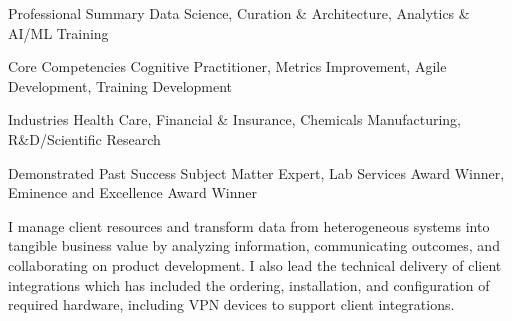 

\begin{cvskills}

  \cvskill
    {Professional Summary} %
    {Data Science, Curation \& Architecture, Analytics \& AI/ML Training} 

  \cvskill
    {Core Competencies} %
    {Cognitive Practitioner, Metrics Improvement, Agile Development, Training Development}

  \cvskill
    {Industries} %
    {Health Care, Financial \& Insurance, Chemicals Manufacturing, R\&D/Scientific Research}

  \cvskill
    {Demonstrated Past Success} %
    {Subject Matter Expert, Lab Services Award Winner, Eminence and Excellence Award Winner}

\end{cvskills}

\begin{cvparagraph}
  I manage client resources and transform data from heterogeneous systems into tangible business value by analyzing information, communicating outcomes, and collaborating on product development.  I also lead the technical delivery of client integrations which has included the ordering, installation, and configuration of required hardware, including VPN devices to support client integrations.
\end{cvparagraph}

